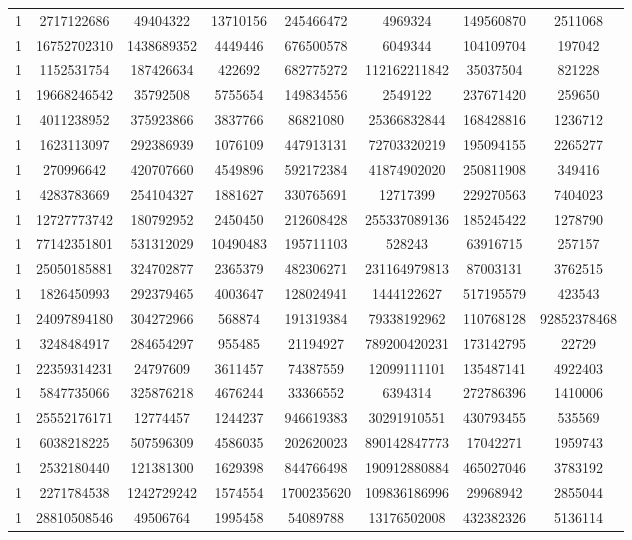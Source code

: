 \documentclass[solution, letterpaper]{cs121}
\begin{document}
\begin{center}
\begin{tabular}{ c |c c c c c c c}
1 & 2717122686 & 49404322 & 13710156 & 245466472 & 4969324 & 149560870 & 2511068 \\
1 & 16752702310 & 1438689352 & 4449446 & 676500578 & 6049344 & 104109704 & 197042 \\
1 & 1152531754 & 187426634 & 422692 & 682775272 & 112162211842 & 35037504 & 821228 \\
1 & 19668246542 & 35792508 & 5755654 & 149834556 & 2549122 & 237671420 & 259650 \\
1 & 4011238952 & 375923866 & 3837766 & 86821080 & 25366832844 & 168428816 & 1236712 \\
1 & 1623113097 & 292386939 & 1076109 & 447913131 & 72703320219 & 195094155 & 2265277 \\
1 & 270996642 & 420707660 & 4549896 & 592172384 & 41874902020 & 250811908 & 349416 \\
1 & 4283783669 & 254104327 & 1881627 & 330765691 & 12717399 & 229270563 & 7404023 \\
1 & 12727773742 & 180792952 & 2450450 & 212608428 & 255337089136 & 185245422 & 1278790 \\
1 & 77142351801 & 531312029 & 10490483 & 195711103 & 528243 & 63916715 & 257157 \\
1 & 25050185881 & 324702877 & 2365379 & 482306271 & 231164979813 & 87003131 & 3762515 \\
1 & 1826450993 & 292379465 & 4003647 & 128024941 & 1444122627 & 517195579 & 423543 \\
1 & 24097894180 & 304272966 & 568874 & 191319384 & 79338192962 & 110768128 & 92852378468 \\
1 & 3248484917 & 284654297 & 955485 & 21194927 & 789200420231 & 173142795 & 22729 \\
1 & 22359314231 & 24797609 & 3611457 & 74387559 & 12099111101 & 135487141 & 4922403 \\
1 & 5847735066 & 325876218 & 4676244 & 33366552 & 6394314 & 272786396 & 1410006 \\
1 & 25552176171 & 12774457 & 1244237 & 946619383 & 30291910551 & 430793455 & 535569 \\
1 & 6038218225 & 507596309 & 4586035 & 202620023 & 890142847773 & 17042271 & 1959743 \\
1 & 2532180440 & 121381300 & 1629398 & 844766498 & 190912880884 & 465027046 & 3783192 \\
1 & 2271784538 & 1242729242 & 1574554 & 1700235620 & 109836186996 & 29968942 & 2855044 \\
1 & 28810508546 & 49506764 & 1995458 & 54089788 & 13176502008 & 432382326 & 5136114 \\

\end{tabular}
\end{center}
\end{document}
